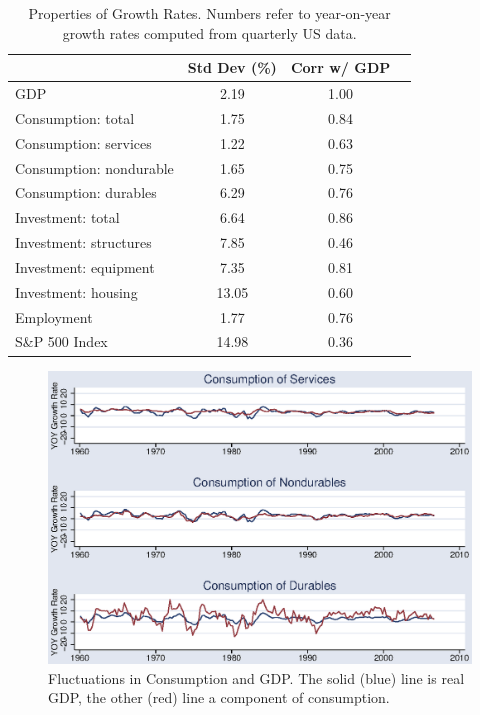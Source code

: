 \documentclass[letterpaper,12pt]{article}
\begin{document}
\begin{table}[h!]
\begin{center}
\begin{tabular}{lccc}
\toprule 
        &  Std Dev (\%)  &  Corr w/ GDP  \\
\midrule 
GDP     &      2.19          &    1.00      \\
Consumption:  total      &  1.75  &  0.84   \\
Consumption:  services   &  1.22  &  0.63   \\
Consumption:  nondurable &  1.65  &  0.75   \\
Consumption:  durables   &  6.29  &  0.76   \\
Investment:  total       &  6.64  &  0.86   \\
Investment:  structures  &  7.85  &  0.46   \\
Investment:  equipment   &  7.35  &  0.81   \\
Investment:  housing     &  13.05\phantom{1} &  0.60   \\
Employment               &  1.77  &  0.76   \\
S\&P 500 Index           &  14.98\phantom{1}  &  0.36   \\
\bottomrule 
\end{tabular}
\caption{Properties of Growth Rates.
Numbers refer to year-on-year growth rates
computed from quarterly US data.}
\label{tab:cycleprops}
\end{center}
\end{table}


\begin{figure}[h!]
    \centering
    \includegraphics[scale=0.8]{usgcall.eps}
    \caption{Fluctuations in Consumption and GDP.
    The solid (blue) line is real GDP, the other (red) line
    a component of consumption.}
    \label{fig:gcall}%
\end{figure}
\end{document}
